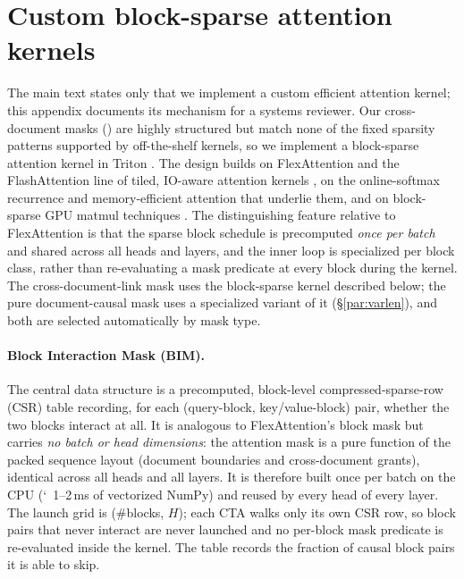 \section{Custom block-sparse attention kernels}
\label{app:kernels}

The main text states only that we implement a custom efficient attention kernel;
this appendix documents its mechanism for a systems reviewer. Our cross-document
masks () are highly structured but match none of the fixed sparsity
patterns supported by off-the-shelf kernels, so we implement a block-sparse
attention kernel in Triton \citep{tillet2019triton}. The design builds on
FlexAttention \citep{flexattention_blog2024,flexattention_paper2024} and the
FlashAttention line of tiled, IO-aware attention kernels
\citep{dao2022flashattention,dao2023flashattention2}, on the online-softmax
recurrence \citep{milakov2018onlinesoftmax} and memory-efficient attention
\citep{rabe2021selfattention} that underlie them, and on block-sparse GPU matmul
techniques \citep{gray2017blocksparse}. The distinguishing feature relative to
FlexAttention is that the sparse block schedule is precomputed \emph{once per batch}
and shared across all heads and layers, and the inner loop is specialized per block
class, rather than re-evaluating a mask predicate at every block during the kernel.
The cross-document-link mask uses the block-sparse kernel described below; the pure
document-causal mask uses a specialized variant of it (\S\ref{par:varlen}), and both
are selected automatically by mask type.

\paragraph{Block Interaction Mask (BIM).}
The central data structure is a precomputed, block-level compressed-sparse-row (CSR)
table recording, for each (query-block, key/value-block) pair, whether the two blocks
interact at all. It is analogous to FlexAttention's block mask but carries \emph{no
batch or head dimensions}: the attention mask is a pure function of the packed
sequence layout (document boundaries and cross-document grants), identical across all
heads and all layers. It is therefore built once per batch on the CPU (\char`~1--2\,ms
of vectorized NumPy) and reused by every head of every layer. The launch grid is
(\#blocks, $H$); each CTA walks only its own CSR row, so block pairs that never
interact are never launched and no per-block mask predicate is re-evaluated inside the
kernel. The table records the fraction of causal block pairs it is able to skip.

